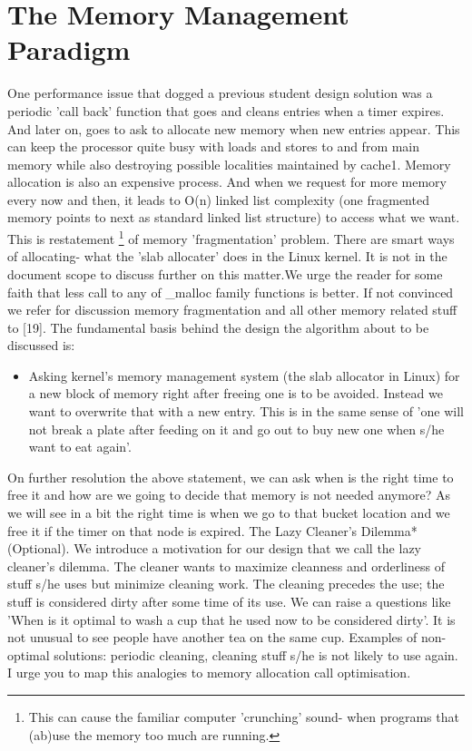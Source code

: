 \section{The Memory Management Paradigm}
One performance issue that dogged a previous student design solution was a
periodic 'call back' function that goes and cleans entries when a timer expires. And
later on, goes to ask to allocate new memory when new entries appear. This can
keep the processor quite busy with loads and stores to and from main memory
while also destroying possible localities maintained by cache1. Memory allocation
is also an expensive process. And when we request for more memory every now
and then, it leads to O(n) linked list complexity (one fragmented memory points to
next as standard linked list structure) to access what we want. This is restatement
\footnote{This can cause the familiar computer 'crunching' sound- when programs that (ab)use the memory too much are running.}
of memory 'fragmentation' problem. There are smart ways of allocating- what the
'slab allocater' does in the Linux kernel. It is not in the document scope to discuss
further on this matter.We urge the reader for some faith that less call to any of
\_malloc family functions is better. If not convinced we refer for discussion memory
fragmentation and all other memory related stuff to [19].
The fundamental basis behind the design the algorithm about to be discussed
is:
\begin{itemize}
\item Asking kernel's memory management system (the slab allocator in Linux)
for a new block of memory right after freeing one is to be avoided. Instead
we want to overwrite that with a new entry. This is in the same sense of
'one will not break a plate after feeding on it and go out to buy new one
when s/he want to eat again'.
\end{itemize}
On further resolution the above statement, we can ask when is the right time to
free it and how are we going to decide that memory is not needed anymore? As we
will see in a bit the right time is when we go to that bucket location and we free it
if the timer on that node is expired.
The Lazy Cleaner's Dilemma* (Optional). We introduce a motivation
for our design that we call the lazy cleaner's dilemma. The cleaner wants to maximize cleanness and orderliness of stuff s/he uses but minimize cleaning work. The
cleaning precedes the use; the stuff is considered dirty after some time of its use.
We can raise a questions like 'When is it optimal to wash a cup that he used now to
be considered dirty'. It is not unusual to see people have another tea on the same
cup. Examples of non-optimal solutions: periodic cleaning, cleaning stuff s/he is
not likely to use again. I urge you to map this analogies to memory allocation call
optimisation.
